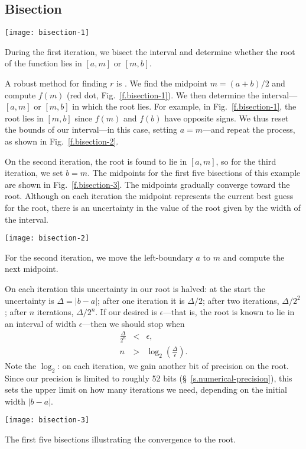 \subsection{Bisection}
\begin{marginfigure}[-18\baselineskip]
\texttt{[image: bisection-1]}
\caption[First bisection step]{During the first iteration, we bisect the interval and determine whether the root of the function lies in $[a,m]$ or $[m,b]$.\label{f.bisection-1}}
\end{marginfigure}
A robust method for finding $r$ is . We find the midpoint $m = (a+b)/2$ and compute $f(m)$ (red dot, Fig.~\ref{f.bisection-1}). We then determine the interval---$[a,m]$ or $[m,b]$ in which the root lies. For example, in Fig.~\ref{f.bisection-1}, the root lies in $[m,b]$ since $f(m)$ and $f(b)$ have opposite signs. We thus reset the bounds of our interval---in this case, setting $a=m$---and repeat the process, as shown in Fig.~\ref{f.bisection-2}.

On the second iteration, the root is found to lie in $[a, m]$, so for the third iteration, we set $b=m$. The midpoints for the first five bisections of this example are shown in Fig.~\ref{f.bisection-3}. The midpoints gradually converge toward the root. Although on each iteration the midpoint represents the current best guess for the root, there is an uncertainty in the value of the root given by the width of the interval.
\begin{marginfigure}
\texttt{[image: bisection-2]}
\caption[Second bisection step]{For the second iteration, we move the left-boundary $a$ to $m$ and compute the next midpoint.\label{f.bisection-2}}
\end{marginfigure}

On each iteration this uncertainty in our root is halved: at the start the uncertainty is $\Delta=|b-a|$; after one iteration it is $\Delta/2$; after two iterations, $\Delta/2^{2}$; after $n$ iterations, $\Delta/2^{n}$. If our desired  is $\epsilon$---that is, the root is known to lie in an interval of width $\epsilon$---then we should stop when
\begin{eqnarray*}
	\frac{\Delta}{2^{n}} &<& \epsilon,\\
	n &>& \log_{2}\left(\frac{\Delta}{\epsilon}\right).
\end{eqnarray*}
Note the $\log_{2}$: on each iteration, we gain another bit of precision on the root. Since our precision is limited to roughly 52 bits (\S~\ref{s.numerical-precision}), this sets the upper limit on how many iterations we need, depending on the initial width $|b-a|$.
\begin{marginfigure}
\texttt{[image: bisection-3]}
\caption[First five bisections]{The first five bisections illustrating the convergence to the root.\label{f.bisection-3}}
\end{marginfigure}

